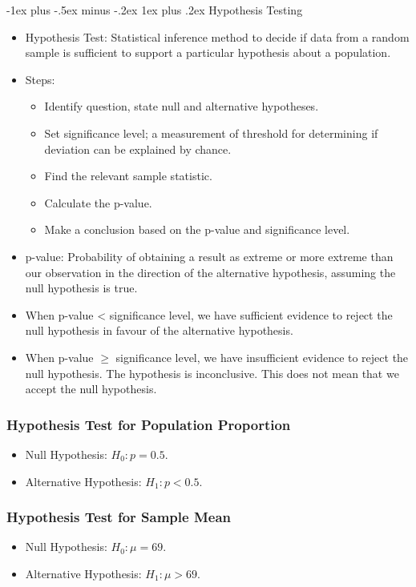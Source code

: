 \documentclass[10pt, landscape]{article}
\makeatletter
\renewcommand{\subsection}{\@startsection{subsection}{3}{0mm}%
                                {-1ex plus -.5ex minus -.2ex}%
                                {1ex plus .2ex}%
                                {\normalfont\small\bfseries}}%
\makeatother
\begin{document}
\begin{multicols*}{3}
\subsection{Hypothesis Testing}
\begin{itemize}
    \item Hypothesis Test: Statistical inference method to decide if data from a random sample is sufficient to support a particular hypothesis about a population.
    \item Steps:
    \begin{itemize}
        \item Identify question, state null and alternative hypotheses.
        \item Set significance level; a measurement of threshold for determining if deviation can be explained by chance.
        \item Find the relevant sample statistic.
        \item Calculate the p-value.
        \item Make a conclusion based on the p-value and significance level.
    \end{itemize}
    \item p-value: Probability of obtaining a result as extreme or more extreme than our observation in the direction of the alternative hypothesis, assuming the null hypothesis is true.
    \item When p-value < significance level, we have sufficient evidence to reject the null hypothesis in favour of the alternative hypothesis.
    \item When p-value $\geq$ significance level, we have insufficient evidence to reject the null hypothesis. The hypothesis is inconclusive. This does not mean that we accept the null hypothesis.
\end{itemize}

\subsubsection{Hypothesis Test for Population Proportion}
\begin{itemize}
    \item Null Hypothesis: $H_0: p=0.5$.
    \item Alternative Hypothesis: $H_1:p<0.5$.
\end{itemize}

\subsubsection{Hypothesis Test for Sample Mean}
\begin{itemize}
    \item Null Hypothesis: $H_0: \mu = 69$.
    \item Alternative Hypothesis: $H_1:\mu >69$.
\end{itemize}


\end{multicols*}
\end{document}
